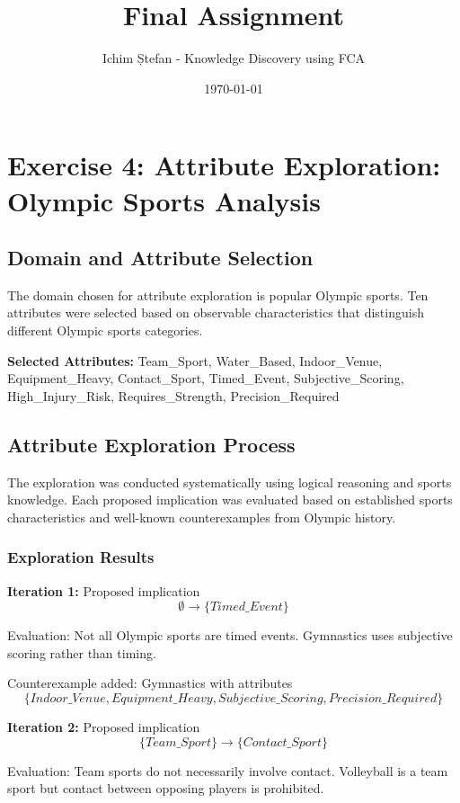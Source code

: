 \documentclass{article}
\title{Final Assignment}
\author{Ichim Ștefan - Knowledge Discovery using FCA}
\date{\today}
\begin{document}
\maketitle

\section*{Exercise 4: Attribute Exploration: Olympic Sports Analysis}

\subsection*{Domain and Attribute Selection}

The domain chosen for attribute exploration is popular Olympic sports. Ten attributes were selected based on observable characteristics that distinguish different Olympic sports categories.

\textbf{Selected Attributes:}
Team\_Sport, Water\_Based, Indoor\_Venue, Equipment\_Heavy, Contact\_Sport, Timed\_Event, Subjective\_Scoring, High\_Injury\_Risk, Requires\_Strength, Precision\_Required

\subsection*{Attribute Exploration Process}

The exploration was conducted systematically using logical reasoning and sports knowledge. Each proposed implication was evaluated based on established sports characteristics and well-known counterexamples from Olympic history.

\subsubsection*{Exploration Results}

\textbf{Iteration 1:} Proposed implication $$\emptyset \rightarrow \{Timed\_Event\}$$

Evaluation: Not all Olympic sports are timed events. Gymnastics uses subjective scoring rather than timing.

Counterexample added: Gymnastics with attributes $$\{Indoor\_Venue, Equipment\_Heavy, Subjective\_Scoring, Precision\_Required\}$$

\textbf{Iteration 2:} Proposed implication $$\{Team\_Sport\} \rightarrow \{Contact\_Sport\}$$

Evaluation: Team sports do not necessarily involve contact. Volleyball is a team sport but contact between opposing players is prohibited.
\end{document}
